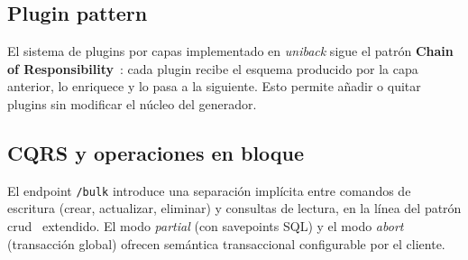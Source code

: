 \subsection{Plugin pattern}
\label{subsec:plugin-pattern}

El sistema de plugins por capas implementado en \textit{uniback} sigue el patrón
\textbf{Chain of Responsibility}~\cite{gof}: cada plugin recibe el esquema producido por
la capa anterior, lo enriquece y lo pasa a la siguiente. Esto permite añadir o quitar
plugins sin modificar el núcleo del generador.

\subsection{CQRS y operaciones en bloque}
\label{subsec:cqrs}

El endpoint \texttt{/bulk} introduce una separación implícita entre comandos de escritura
(crear, actualizar, eliminar) y consultas de lectura, en la línea del patrón
\gls{crud}~\cite{fowler2002} extendido. El modo \textit{partial} (con savepoints SQL) y
el modo \textit{abort} (transacción global) ofrecen semántica transaccional configurable
por el cliente.
